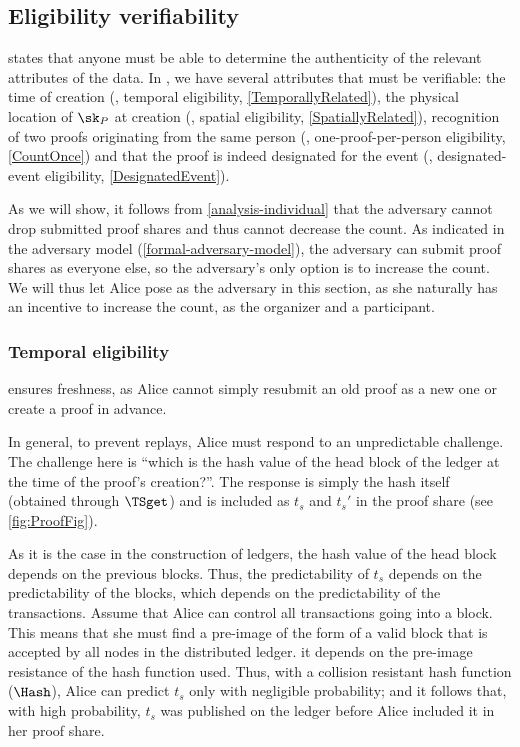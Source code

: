 
\subsection{Eligibility verifiability}%
\label{analysis-eligibility}

 states that anyone must be able to determine the authenticity of the relevant attributes of the data.
In \CROCUS, we have several attributes that must be verifiable: the time of 
creation (\ie, temporal eligibility, \cref{TemporallyRelated}), the physical 
location of \(\sk_P\) at creation (\ie, spatial eligibility, 
\cref{SpatiallyRelated}), recognition of two proofs originating from the same 
person (\ie, one-proof-per-person eligibility, \cref{CountOnce}) and that the 
proof is indeed designated for the event (\ie, designated-event eligibility, 
\cref{DesignatedEvent}).

As we will show, it follows from \cref{analysis-individual} that the adversary 
cannot drop submitted proof shares and thus cannot decrease the count.
As indicated in the adversary model (\cref{formal-adversary-model}), the 
adversary can submit proof shares as everyone else, so the adversary's only 
option is to increase the count.
We will thus let Alice pose as the adversary in this section, as she naturally 
has an incentive to increase the count, as the organizer and a participant.

\subsubsection{Temporal eligibility}%
\label{analysis-temporal}

 ensures freshness, as Alice cannot simply resubmit an 
old proof as a new one or create a proof in advance.

In general, to prevent replays, Alice must respond to an unpredictable 
challenge.
The challenge here is \enquote{which is the hash value of the head block of the 
  ledger at the time of the proof's creation?}.
The response is simply the hash itself (obtained through \(\TSget\)) and is 
included as \(t_s\) and \(t_s'\) in the proof share (see \cref{fig:ProofFig}).

As it is the case in the construction of ledgers, the hash value of the head 
block depends on the previous blocks.
Thus, the predictability of \(t_s\) depends on the predictability of the 
blocks, which depends on the predictability of the transactions.
Assume that Alice can control all transactions going into a block.
This means that she must find a pre-image of the form of a valid block that is 
accepted by all nodes in the distributed ledger.
\Ie it depends on the pre-image resistance of the hash function used.
Thus, with a collision resistant hash function (\(\Hash\)), Alice can predict 
\(t_s\) only with negligible probability; and it follows that, with high 
probability, \(t_s\) was published on the ledger before Alice included it in 
her proof share.

